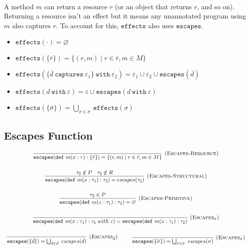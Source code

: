 \documentclass{llncs}
\newcommand{\keywadj}[1]{\mathtt{#1}}
\newcommand{\keyw}[1]{\keywadj{#1}~}
\begin{document}
\paragraph{}
A method $m$ can return a resource $r$ (or an object that returns $r$, and so on). Returning a resource isn't an effect but it means any unannotated program using $m$ also captures $r$. To account for this, $\keywadj{effects}$ also uses $\keywadj{escapes}$.

\begin{itemize}
	\item $\keywadj{effects}(\cdot) = \varnothing$
	\item $\keywadj{effects}(\{\bar r\}) = \{ (r, m) \mid r \in \bar r, m \in M \}$
	\item $\keywadj{effects}(\{ \bar d~\keyw{captures} \varepsilon_1 \}~\keyw{with} \varepsilon_2) = \varepsilon_1 \cup \varepsilon_2 \cup \keywadj{escapes}(\bar d)$
	\item $\keywadj{effects}(d~\keyw{with} \varepsilon) = \varepsilon \cup \keywadj{escapes}(d~\keyw{with} \varepsilon)$
	\item $\keywadj{effects}(\{\bar \sigma\}) = \bigcup_{\sigma \in \bar \sigma}~\keywadj{effects}(\sigma)$
\end{itemize}

\subsection{Escapes Function}

\fbox{$\keywadj{escapes(\tau)}$}

\[
\begin{array}{c}
\infer[\textsc{(Escapes-Resource)}]
	{\keyw{escapes(def} m(x : \tau) : \{ \bar r \}) = \{ (r, m) \mid r \in \bar r, m \in M \}}
	{} \\[4ex]
	
\infer[\textsc{(Escapes-Structural)}]
	{\keywadj{escapes(def}~m(x : \tau_1) : \tau_2) = escapes(\tau_2)}
	{\tau_2 \notin P & \tau_2 \notin R} \\[4ex]

\infer[\textsc{(Escapes-Primitive)}]
	{\keyw{escapes(def} m(x : \tau_1) : \tau_2) = \varnothing}
	{\tau_2 \in P} \\[4ex]

\infer[\textsc{(Escapes$_\sigma$)}]
	{\keywadj{escapes(def}~m(x : \tau_1) : \tau_2~ with~\varepsilon) = \keywadj{escapes(def}~m(x : \tau_1) : \tau_2)}
	{} \\[4ex]

\infer[\textsc{(Escapes$_{\bar d}$)}]
	{\keywadj{escapes}(\{\bar d\}) = \bigcup_{d \in \bar d}~escapes(d)}
	{}
~~~~~~~~
\infer[\textsc{(Escapes$_{\bar \sigma}$)}]
	{\keywadj{escapes}(\{\bar \sigma\}) = \bigcup_{\sigma \in \bar \sigma}~escapes(\sigma)}
	{} \\[4ex]
	
\end{array}
\]

\newpage
\end{document}
